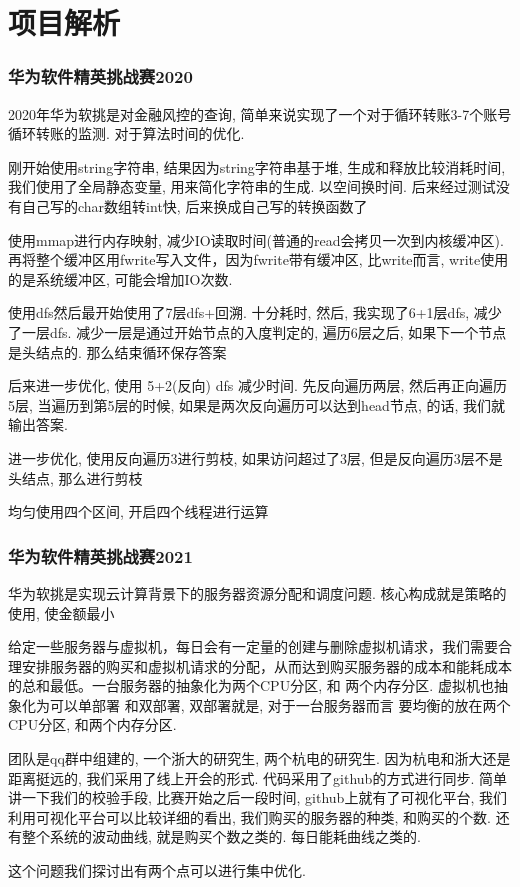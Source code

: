 \documentclass[UTF8]{ctexart}
\begin{document}
\section{项目解析}
\subsubsection{华为软件精英挑战赛2020}
2020年华为软挑是对金融风控的查询, 简单来说实现了一个对于循环转账3-7个账号循环转账的监测. 对于算法时间的优化. \par
刚开始使用string字符串, 结果因为string字符串基于堆, 生成和释放比较消耗时间, 我们使用了全局静态变量, 用来简化字符串的生成. 以空间换时间. 后来经过测试没有自己写的char数组转int快, 后来换成自己写的转换函数了 \par
使用mmap进行内存映射, 减少IO读取时间(普通的read会拷贝一次到内核缓冲区). 再将整个缓冲区用fwrite写入文件，因为fwrite带有缓冲区, 比write而言, write使用的是系统缓冲区, 可能会增加IO次数.\par
使用dfs然后最开始使用了7层dfs+回溯. 十分耗时, 然后, 我实现了6+1层dfs, 减少了一层dfs. 减少一层是通过开始节点的入度判定的, 遍历6层之后, 如果下一个节点是头结点的. 那么结束循环保存答案\par
后来进一步优化, 使用 5+2(反向) dfs 减少时间. 先反向遍历两层, 然后再正向遍历5层, 当遍历到第5层的时候, 如果是两次反向遍历可以达到head节点, 的话, 我们就输出答案. \par
进一步优化, 使用反向遍历3进行剪枝, 如果访问超过了3层, 但是反向遍历3层不是头结点, 那么进行剪枝 \par
均匀使用四个区间, 开启四个线程进行运算 \par
\subsubsection{华为软件精英挑战赛2021}
华为软挑是实现云计算背景下的服务器资源分配和调度问题.  核心构成就是策略的使用, 使金额最小 \par
给定一些服务器与虚拟机，每日会有一定量的创建与删除虚拟机请求，我们需要合理安排服务器的购买和虚拟机请求的分配，从而达到购买服务器的成本和能耗成本的总和最低。一台服务器的抽象化为两个CPU分区, 和 两个内存分区.  虚拟机也抽象化为可以单部署 和双部署, 双部署就是, 对于一台服务器而言 要均衡的放在两个CPU分区, 和两个内存分区. \par
团队是qq群中组建的, 一个浙大的研究生, 两个杭电的研究生. 因为杭电和浙大还是距离挺远的, 我们采用了线上开会的形式.  代码采用了github的方式进行同步. 简单讲一下我们的校验手段, 比赛开始之后一段时间, github上就有了可视化平台, 我们利用可视化平台可以比较详细的看出, 我们购买的服务器的种类, 和购买的个数.  还有整个系统的波动曲线, 就是购买个数之类的. 每日能耗曲线之类的. \par
这个问题我们探讨出有两个点可以进行集中优化. \par
\end{document}
